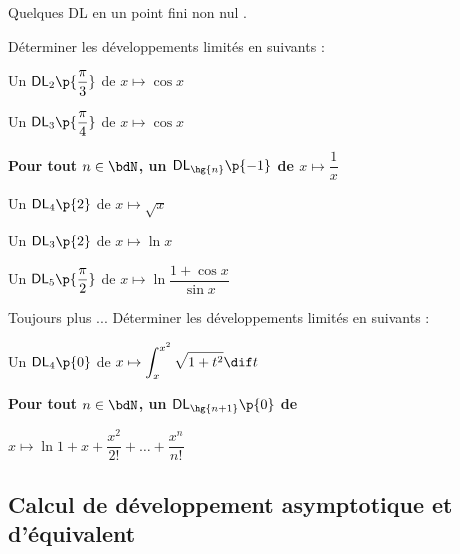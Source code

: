 \documentclass[a4paper,french,bookmarks]{article}
\begin{document}
    \bigskip
    
    \begin{exercise}{Quelques DL en un point fini non nul}{}
        \medskip {}.\medskip
        
       Déterminer les développements limités en suivants :\medskip
        
        \begin{enumerate}
            \begin{minipage}{0.48\linewidth}
                \itt Un $\mathsf{DL}_2\p{\dfrac{\pi}{3}}$ de $x \mapsto \cos x$
                
                \itt Un $\mathsf{DL}_3\p{\dfrac{\pi}{4}}$ de $x \mapsto \cos x$
            
                \itt \bf{Pour tout $n \in \bdN$}, un $\mathsf{DL}_{\hg{n}}\p{-1}$ de $x \mapsto \dfrac{1}{x}$
            \end{minipage}
            \hfill
            \begin{minipage}{0.48\linewidth}
                \itt Un $\mathsf{DL}_4\p{2}$ de $x \mapsto \sqrt{x}$
                
                \itt Un $\mathsf{DL}_3\p{2}$ de $x \mapsto \ln x$
                
                \itt Un $\mathsf{DL}_5\p{\dfrac{\pi}{2}}$ de $x \mapsto \ln{\dfrac{1 + \cos x}{\sin x}}$
            \end{minipage}
        \end{enumerate}
    \end{exercise}
    
    \bigskip
    
        \begin{exercise}{Toujours plus ...}{}
        \medskip Déterminer les développements limités en suivants :\medskip
        
        \begin{enumerate}
            \begin{minipage}{0.48\linewidth}
                \itt Un $\mathsf{DL}_4\p{0}$ de $\displaystyle x \mapsto \int_x^{x^2} \sqrt{1 + t^2}\dif t$
            \end{minipage}
            \hfill
            \begin{minipage}{0.48\linewidth}
                \itt \bf{Pour tout $n \in \bdN$}, un $\mathsf{DL}_{\hg{n+1}}\p{0}$ de 
                
                $x \mapsto \ln{1 + x + \dfrac{x^2}{2!} + \dots + \dfrac{x^n}{n!}}$
            \end{minipage}
        \end{enumerate}
    \end{exercise}
    
    \newpage
    
    \subsection{Calcul de développement asymptotique et d'équivalent}
    
    
    
\end{document}
